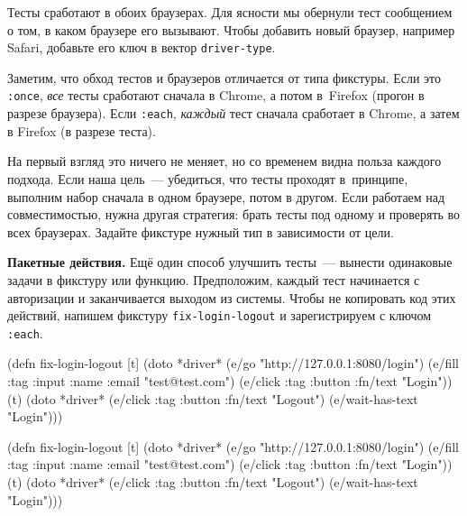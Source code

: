 \fi

Тесты сработают в обоих браузерах. Для ясности мы обернули тест сообщением о
том, в каком браузере его вызывают. Чтобы добавить новый браузер, например
Safari, добавьте его ключ в вектор \verb|driver-type|.


Заметим, что обход тестов и браузеров отличается от типа фикстуры. Если это
\verb|:once|, \emph{все} тесты сработают сначала в Chrome, а потом в~Firefox
(прогон в разрезе браузера). Если \verb|:each|, \emph{каждый} тест сначала
сработает в Chrome, а затем в Firefox (в разрезе теста).

На первый взгляд это ничего не меняет, но со временем видна польза каждого
подхода. Если наша цель~--- убедиться, что тесты проходят в~принципе, выполним набор
сначала в одном браузере, потом в другом. Если работаем над совместимостью,
нужна другая стратегия: брать тесты под одному и проверять во всех
браузерах. Задайте фикстуре нужный тип в зависимости от цели.

\textbf{Пакетные действия.} Ещё один способ улучшить тесты~--- вынести
одинаковые задачи в фикстуру или функцию. Предположим, каждый тест начинается с
авторизации и заканчивается выходом из системы. Чтобы не копировать код этих
действий, напишем фикстуру \verb|fix-login-logout| и зарегистрируем с ключом
\verb|:each|.

\ifx\DEVICETYPE\MOBILE

\begin{english}
  \begin{clojure}
(defn fix-login-logout [t]
  (doto *driver*
    (e/go "http://127.0.0.1:8080/login")
    (e/fill {:tag :input :name :email}
      "test@test.com")
    (e/click
      {:tag :button :fn/text "Login"}))
  (t)
  (doto *driver*
    (e/click {:tag :button
              :fn/text "Logout"})
    (e/wait-has-text "Login")))
  \end{clojure}
\end{english}

\else

\begin{english}
  \begin{clojure}
(defn fix-login-logout [t]
  (doto *driver*
    (e/go "http://127.0.0.1:8080/login")
    (e/fill {:tag :input
             :name :email} "test@test.com")
    (e/click {:tag :button
              :fn/text "Login"}))
  (t)
  (doto *driver*
    (e/click {:tag :button
              :fn/text "Logout"})
    (e/wait-has-text "Login")))
  \end{clojure}
\end{english}

